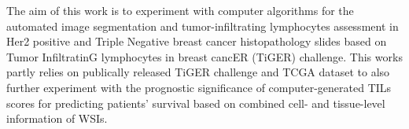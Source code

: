 The aim of this work is to experiment with computer algorithms for the automated image segmentation and tumor-infiltrating
lymphocytes assessment in Her2 positive
and Triple Negative breast cancer histopathology slides based on Tumor InfiltratinG lymphocytes in
breast cancER (TiGER) challenge. This works partly relies on publically
released TiGER challenge and TCGA dataset to also further experiment with the prognostic significance of computer-generated TILs scores
for predicting patients' survival based on combined cell- and tissue-level information of WSIs. 